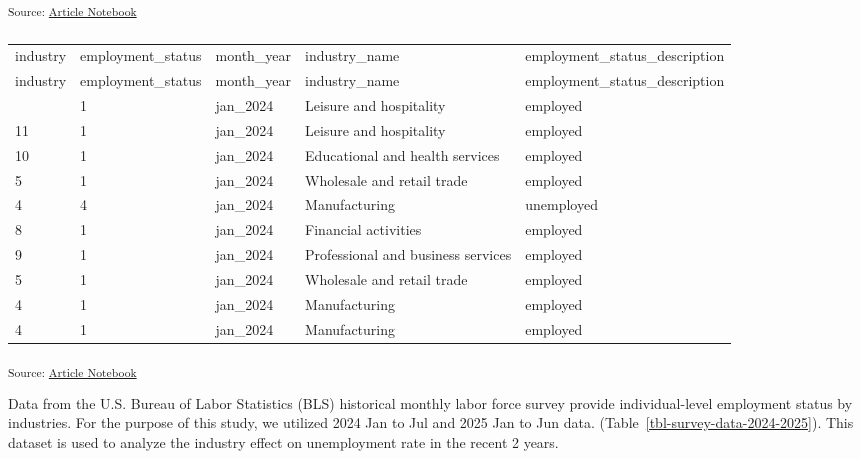 \documentclass[
]{agujournal2019}
\begin{document}
\textsubscript{Source:
\href{https://mw1296.github.io/dsan5650_social_causal_inference/index.qmd.html}{Article
Notebook}}

\begin{longtable}[]{@{}lllll@{}}

\caption{\label{tbl-survey-data-2024-2025}BLS 2024 - 2025 Jan - Jul
Labor Force Survey Data}

\tabularnewline

\caption{}\label{T_cc2f2}\tabularnewline
\toprule\noalign{}
industry & employment\_status & month\_year & industry\_name &
employment\_status\_description \\
\midrule\noalign{}
\endfirsthead
\toprule\noalign{}
industry & employment\_status & month\_year & industry\_name &
employment\_status\_description \\
\midrule\noalign{}
\endhead
\bottomrule\noalign{}
\endlastfoot
11 & 1 & jan\_2024 & Leisure and hospitality & employed \\
11 & 1 & jan\_2024 & Leisure and hospitality & employed \\
10 & 1 & jan\_2024 & Educational and health services & employed \\
5 & 1 & jan\_2024 & Wholesale and retail trade & employed \\
4 & 4 & jan\_2024 & Manufacturing & unemployed \\
8 & 1 & jan\_2024 & Financial activities & employed \\
9 & 1 & jan\_2024 & Professional and business services & employed \\
5 & 1 & jan\_2024 & Wholesale and retail trade & employed \\
4 & 1 & jan\_2024 & Manufacturing & employed \\
4 & 1 & jan\_2024 & Manufacturing & employed \\

\end{longtable}

\textsubscript{Source:
\href{https://mw1296.github.io/dsan5650_social_causal_inference/index.qmd.html}{Article
Notebook}}

Data from the U.S. Bureau of Labor Statistics (BLS) historical monthly
labor force survey provide individual-level employment status by
industries. For the purpose of this study, we utilized 2024 Jan to Jul
and 2025 Jan to Jun data. (Table~\ref{tbl-survey-data-2024-2025}). This
dataset is used to analyze the industry effect on unemployment rate in
the recent 2 years.
\end{document}
